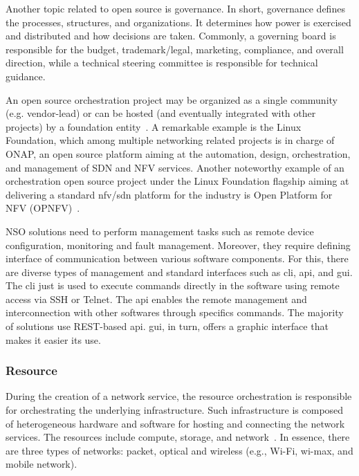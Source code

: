 Another topic related to open source is governance. In short, governance defines the processes, structures, and organizations. It determines how power is exercised and distributed and how decisions are taken. Commonly, a governing board is responsible for the budget, trademark/legal, marketing, compliance, and overall direction, while a technical steering committee is responsible for technical guidance. 

An open source orchestration project may be organized as a single community (e.g. vendor-lead) or can be hosted (and eventually integrated with other projects) by a foundation entity~\cite{Opensource.comFourOpensource.com}. A remarkable example is the Linux Foundation, which among multiple networking related projects is in charge of  ONAP, an open source platform aiming at the  automation, design, orchestration, and management of SDN and NFV services. Another noteworthy example of an orchestration open source project under the Linux Foundation flagship  aiming at delivering a standard \gls{nfv}/\gls{sdn} platform for the industry is Open Platform for NFV (OPNFV)~\cite{LinuxFoundation}.

NSO solutions need to perform management tasks such as remote device configuration, monitoring and fault management. Moreover, they require defining interface of communication between various software components. For this, there are diverse types of management and  standard interfaces such as \gls{cli}, \gls{api}, and \gls{gui}. The \gls{cli} just is used to execute commands directly in the software using remote access via SSH or Telnet. The \gls{api} enables the remote management and interconnection with other softwares through specifics commands. The majority of solutions use REST-based \gls{api}. \gls{gui}, in turn, offers a graphic interface that makes it easier its use.   

\subsubsection{Resource}
During the creation of a network service, the resource orchestration is responsible for orchestrating the underlying infrastructure. Such infrastructure is composed of heterogeneous hardware and software for hosting and connecting the network services. The resources include compute, storage, and network~\cite{Ordonez-Lucena2017NetworkChallenges}. In essence, there are three types of networks: packet, optical and wireless (e.g., Wi-Fi, wi-max, and mobile network).

